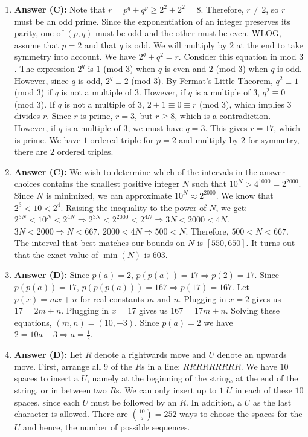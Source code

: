 \documentclass[12pt]{scrartcl}
\begin{document}
\begin{enumerate}
\item \textbf{Answer (C):} Note that $r=p^{q}+q^{p}\ge2^{2}+2^{2}=8$. Therefore, $r\ne2$, so $r$ must be an odd prime. Since the exponentiation of an integer preserves its parity, one of $(p, q)$ must be odd and the other must be even. WLOG, assume that $p=2$ and that $q$ is odd. We will multiply by $2$ at the end to take symmetry into account. We have $2^{q}+q^{2}=r$. Consider this equation in mod $3$. The expression $2^{q}$ is $1$ (mod $3$) when $q$ is even and $2$ (mod $3$) when $q$ is odd. However, since $q$ is odd, $2^{q}\equiv2$ (mod $3$). By Fermat's Little Theorem, $q^{2}\equiv1$ (mod $3$) if $q$ is not a multiple of $3$. However, if $q$ is a multiple of $3$, $q^{2}\equiv0$ (mod $3$). If $q$ is not a multiple of $3$, $2+1\equiv0\equiv r$ (mod $3$), which implies $3$ divides $r$. Since $r$ is prime, $r=3$, but $r\ge8$, which is a contradiction. However, if $q$ is a multiple of $3$, we must have $q=3$. This gives $r=17$, which is prime. We have $1$ ordered triple for $p=2$ and multiply by $2$ for symmetry, there are $2$ ordered triples.

\item \textbf{Answer (C):} We wish to determine which of the intervals in the answer choices contains the smallest positive integer $N$ such that $10^{N}>4^{1000}=2^{2000}$. Since $N$ is minimized, we can approximate $10^{N}\approx2^{2000}$. We know that $2^{3}<10<2^{4}$. Raising the inequality to the power of $N$, we get: $2^{3N}<10^{N}<2^{4N}\Rightarrow2^{3N}<2^{2000}<2^{4N}\Rightarrow3N<2000<4N$. $3N<2000\Rightarrow N<667$. $2000<4N\Rightarrow500<N$. Therefore, $500<N<667$. The interval that best matches our bounds on $N$ is $[550,650]$. It turns out that the exact value of $\min(N)$ is $603$.

\item \textbf{Answer (D):} Since $p(a)=2$, $p(p(a))=17\Rightarrow p(2)=17$. Since $p(p(a))=17$, $p(p(p(a)))=167\Rightarrow p(17)=167$. Let $p(x)=mx+n$ for real constants $m$ and $n$. Plugging in $x=2$ gives us $17=2m+n$. Plugging in $x=17$ gives us $167=17m+n$. Solving these equations, $(m,n)=(10,-3)$. Since $p(a)=2$ we have $2=10a-3\Rightarrow a=\frac{1}{2}$.

\item \textbf{Answer (D):} Let $R$ denote a rightwards move and $U$ denote an upwards move. First, arrange all $9$ of the $R$s in a line: $RRRRRRRRR$. We have $10$ spaces to insert a $U$, namely at the beginning of the string, at the end of the string, or in between two $R$s. We can only insert up to $1$ $U$ in each of these $10$ spaces, since each $U$ must be followed by an $R$. In addition, a $U$ as the last character is allowed. There are $\binom{10}{5}=252$ ways to choose the spaces for the $U$ and hence, the number of possible sequences.


\end{enumerate}
\end{document}
